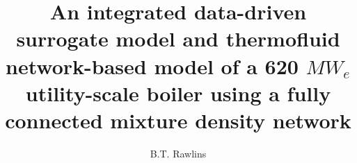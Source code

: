\documentclass[a4paper,fleqn]{cas-sc}
\begin{document}
\let\WriteBookmarks\relax
\def\floatpagepagefraction{1}
\def\textpagefraction{.001}

\shorttitle{}    

%
%
%
%
%
%

\title [mode = title]{An integrated data-driven surrogate model and thermofluid network-based model of a 620 $MW_e$ utility-scale boiler using a fully connected mixture density network}  



%

\author[1]{B.T. Rawlins}

\cormark[1]

\end{document}
